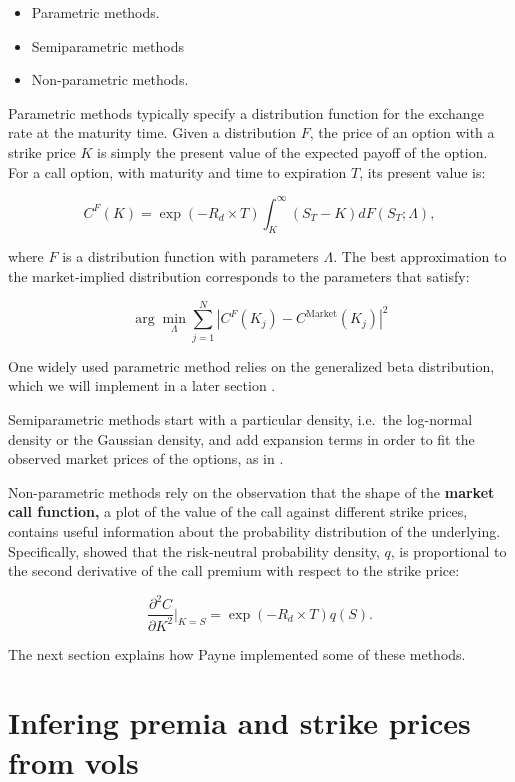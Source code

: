\documentclass[]{book}
\providecommand{\tightlist}{%
  \setlength{\itemsep}{0pt}\setlength{\parskip}{0pt}}
\theoremstyle{definition}
\theoremstyle{definition}
\theoremstyle{definition}
\theoremstyle{remark}
\begin{document}
\begin{itemize}
\tightlist
\item
  Parametric methods.
\item
  Semiparametric methods
\item
  Non-parametric methods.
\end{itemize}

Parametric methods typically specify a distribution function for the
exchange rate at the maturity time. Given a distribution \(F\), the
price of an option with a strike price \(K\) is simply the present value
of the expected payoff of the option. For a call option, with maturity
and time to expiration \(T\), its present value is:

\[
C^F(K) = \exp(-R_d\times T) \int_{K}^{\infty} \left( S_T - K\right) dF(S_T; \Lambda), 
\]

where \(F\) is a distribution function with parameters \(\Lambda\). The
best approximation to the market-implied distribution corresponds to the
parameters that satisfy:

\[
\arg\min_{\Lambda} \sum_{j=1}^N |C^F(K_j) - C^{\text{Market}}(K_j)|^2
\]

One widely used parametric method relies on the generalized beta
distribution, which we will implement in a later section
\citep{Bookstaber-McDonald1987}.

Semiparametric methods start with a particular density, i.e.~the
log-normal density or the Gaussian density, and add expansion terms in
order to fit the observed market prices of the options, as in
\citet{Jarrow-Rudd1982}.

Non-parametric methods rely on the observation that the shape of the
\textbf{market call function,} a plot of the value of the call against
different strike prices, contains useful information about the
probability distribution of the underlying. Specifically,
\citet{Breeden-Litzenberger1978} showed that the risk-neutral
probability density, \(q\), is proportional to the second derivative of
the call premium with respect to the strike price:

\[
\frac{\partial^2 C}{\partial K^2} \bigg\rvert_{K=S} = \exp(-R_d \times T)q(S).
\]

The next section explains how Payne implemented some of these methods.

\section{Infering premia and strike prices from
vols}\label{infering-premia-and-strike-prices-from-vols}
\end{document}
